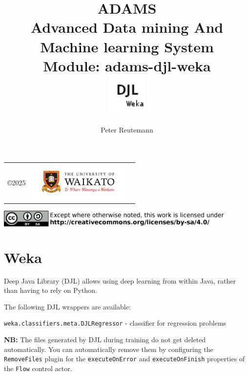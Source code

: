 \documentclass[a4paper]{book}
\title{
  \textbf{ADAMS} \\
  {\Large \textbf{A}dvanced \textbf{D}ata mining \textbf{A}nd \textbf{M}achine
  learning \textbf{S}ystem} \\
  {\Large Module: adams-djl-weka} \\
  \vspace{1cm}
  \includegraphics[width=2cm]{images/djl-weka-module.png} \\
}
\author{
  Peter Reutemann
}
\begin{document}
\begin{titlepage}
\maketitle

\thispagestyle{empty}
\center
\begin{table}[b]
	\begin{tabular}{c l l}
		\parbox[c][2cm]{2cm}{\copyright 2025} &
		\parbox[c][2cm]{5cm}{\includegraphics[width=5cm]{images/coat_of_arms.pdf}} \\
	\end{tabular}
	\includegraphics[width=12cm]{images/cc.png} \\
\end{table}

\end{titlepage}

\tableofcontents

\chapter{Weka}
Deep Java Library (DJL) allows using deep learning from within Java, rather than having to rely on Python.

\noindent The following DJL wrappers are available:
\begin{tight_itemize}
    \item \texttt{weka.classifiers.meta.DJLRegressor} - classifier for regression problems
\end{tight_itemize}

\noindent \textbf{NB:} The files generated by DJL during training do not get deleted automatically. You can
automatically remove them by configuring the \texttt{RemoveFiles} plugin for the \texttt{executeOnError} and
\texttt{executeOnFinish} properties of the \texttt{Flow} control actor.


\end{document}
